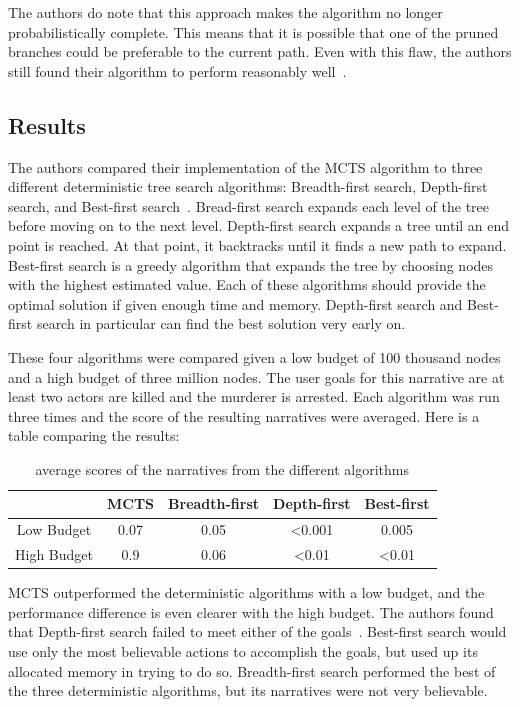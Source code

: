 \documentclass{sig-alternate}
\begin{document}
The authors do note that this approach makes the algorithm no longer probabilistically complete. This means that it is possible that one of the pruned branches could be preferable to the current path. Even with this flaw, the authors still found their algorithm to perform reasonably well~\cite{Narrative}.

\subsection{Results}
The authors compared their implementation of the MCTS algorithm to three different deterministic tree search algorithms: Breadth-first search, Depth-first search, and Best-first search~\cite{Narrative}. Bread-first search expands each level of the tree before moving on to the next level. Depth-first search expands a tree until an end point is reached. At that point, it backtracks until it finds a new path to expand. Best-first search is a greedy algorithm that expands the tree by choosing nodes with the highest estimated value. Each of these algorithms should provide the optimal solution if given enough time and memory. Depth-first search and Best-first search in particular can find the best solution very early on.

These four algorithms were compared given a low budget of 100 thousand nodes and a high budget of three million nodes. The user goals for this narrative are at least two actors are killed and the murderer is arrested. Each algorithm was run three times and the score of the resulting narratives were averaged. Here is a table comparing the results: 

\begin{table}[h]
	\begin{tabular}{ c | c | c | c | c |}
	\cline{2-5}	 
	 & MCTS & Breadth-first & Depth-first & Best-first \\ \hline
	\multicolumn{1}{|p{1.05cm}|}{Low Budget} & 0.07 & 0.05 & <0.001 & 0.005 \\ \hline
	\multicolumn{1}{|p{1.05cm}|}{High Budget} & 0.9 & 0.06 & <0.01 & <0.01 \\ \hline
	\end{tabular}
	\caption[Table caption text]{average scores of the narratives from the different algorithms}
\end{table}

MCTS outperformed the deterministic algorithms with a low budget, and the performance difference is even clearer with the high budget. The authors found that Depth-first search failed to meet either of the goals~\cite{Narrative}. Best-first search would use only the most believable actions to accomplish the goals, but used up its allocated memory in trying to do so. Breadth-first search performed the best of the three deterministic algorithms, but its narratives were not very believable.
\end{document}
